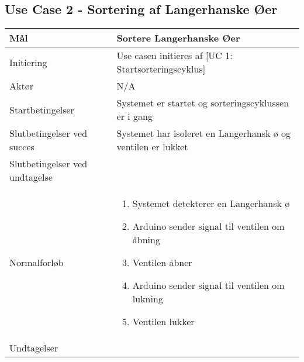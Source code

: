 \subsection{Use Case 2 - Sortering af Langerhanske Øer}
\label{uc:2}
\begin{center}
		\begin{longtable}{ | m{4cm} | m{8cm}| } 
			\hline
			Mål & Sortere Langerhanske Øer \\ 
			\hline
			Initiering &  Use casen initieres af [UC 1: Startsorteringscyklus]\\
			\hline
			Aktør & N/A \\ 
			\hline
			Startbetingelser & Systemet er startet og sorteringscyklussen er i gang\\ 
			\hline	
			Slutbetingelser ved succes & Systemet har isoleret en Langerhansk ø og ventilen er lukket \\
			\hline
			Slutbetingelser ved undtagelse & \\
			\hline
			Normalforløb & \begin{enumerate}
				\setlength\itemsep{0cm} %
				\item Systemet detekterer en Langerhansk ø
				\item Arduino sender signal til ventilen om åbning
				\item Ventilen åbner
				\item Arduino sender signal til ventilen om lukning
				\item Ventilen lukker
			\end{enumerate} \\ 
			\hline
			Undtagelser & \\
			\hline
		\end{longtable}
		
	\end{center}
	\pagebreak